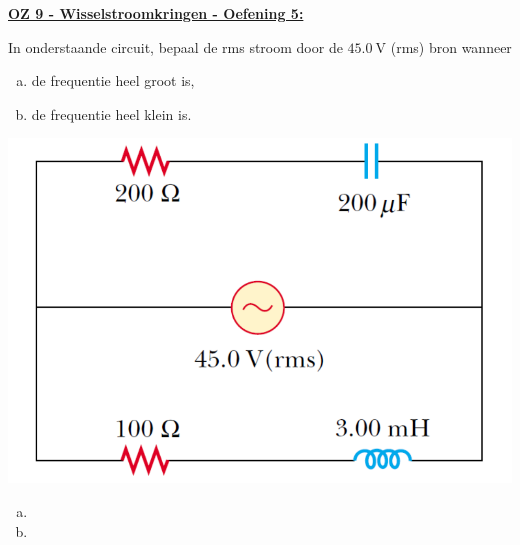 \textbf{\underline{OZ 9 - Wisselstroomkringen - Oefening 5:}}
\vspace{0.5cm}

\vspace{-0.5cm}\begin{minipage}{.66\textwidth}
    In onderstaande circuit, bepaal de rms stroom door de $45.0 \ \text{V}$ (rms) bron wanneer
    \begin{enumerate}[(a)]
        \item de frequentie heel groot is,
        \item de frequentie heel klein is.
    \end{enumerate}
\end{minipage}
\begin{minipage}{.3\textwidth}
    \hspace{0.5cm}\includegraphics[scale = 0.3]{oz09/resources/Oz9Oef5.png}
\end{minipage}

\begin{enumerate}[(a)]
    \item
        \begin{description}[labelwidth=1.5cm, leftmargin=!]
            \item[Geg. :]   
            \item[Gevr. :] 
            \item[Opl. :]   
        \end{description}
    \item 
        \begin{description}[labelwidth=1.5cm, leftmargin=!]
            \item[Geg. :]   
            \item[Gevr. :] 
            \item[Opl. :]   
        \end{description}
\end{enumerate}

\vspace{1cm}